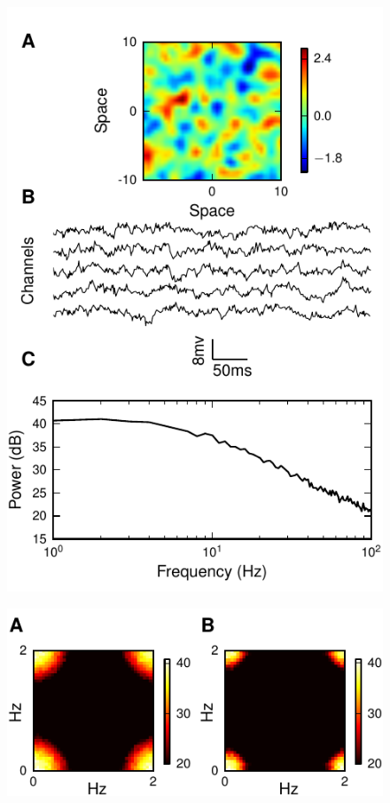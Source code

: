 \documentclass[5p,authoryear]{elsarticle}
\begin{document}
\begin{figure}[!ht]
\begin{center}
\includegraphics{./Graph/pdf/fig3.pdf}
\end{center}
\caption{} 
\label{fig:Figure3}
\end{figure}
\clearpage
\newpage
\begin{figure}[!ht]
\begin{center}
\includegraphics{./Graph/pdf/fig4.pdf}
\end{center}
\caption{}
\label{fig:Figure4}
\end{figure}
\end{document}
